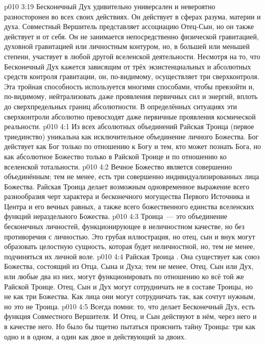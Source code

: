 \vs p010 3:19 \pc Бесконечный Дух удивительно универсален и невероятно разносторонен во всех своих действиях. Он действует в сферах разума, материи и духа. Совместный Вершитель представляет ассоциацию Отец\hyp{}Сын, но он также действует и от себя. Он не занимается непосредственно физической гравитацией, духовной гравитацией или личностным контуром, но, в большей или меньшей степени, участвует в любой другой вселенской деятельности. Несмотря на то, что Бесконечный Дух кажется зависящим от трёх экзистенциальных и абсолютных средств контроля гравитации, он, по\hyp{}видимому, осуществляет три сверхконтроля. Эта тройная способность используется многими способами, чтобы превзойти и, по\hyp{}видимому, нейтрализовать даже проявления первичных сил и энергий, вплоть до сверхпредельных границ абсолютности. В определённых ситуациях эти сверхконтроли абсолютно превосходят даже первичные проявления космической реальности.
\vs p010 4:1 Из всех абсолютных объединений Райская Троица (первое триединство) уникальна как исключительное объединение личного Божества. Бог действует как Бог только по отношению к Богу и тем, кто может познать Бога, но как абсолютное Божество только в Райской Троице и по отношению ко вселенской тотальности.
\vs p010 4:2 \pc Вечное Божество является совершенно объединённым; тем не менее, есть три совершенно индивидуализированных лица Божества. Райская Троица делает возможным одновременное выражение всего разнообразия черт характера и бесконечного могущества Первого Источника и Центра и его вечных равных, а также всего божественного единства вселенских функций нераздельного Божества.
\vs p010 4:3 Троица~--- это объединение бесконечных личностей, функционирующее в неличностном качестве, но без противоречия с личностью. Это грубая иллюстрация, но отец, сын и внук могут образовать целостную сущность, которая будет неличностной, но, тем не менее, подчиняться их личной воле.
\vs p010 4:4 Райская Троица . Она существует как союз Божества, состоящий из Отца, Сына и Духа; тем не менее, Отец, Сын или Дух, или любые два из них, могут функционировать по отношению ко всё той же Райской Троице. Отец, Сын и Дух могут сотрудничать не в составе Троицы, но не как три Божества. Как лица они могут сотрудничать так, как сочтут нужным, но это не Троица.
\vs p010 4:5 \pc Всегда помни: то, что делает Бесконечный Дух, есть функция Совместного Вершителя. И Отец, и Сын действуют в нём, через него и в качестве него. Но было бы тщетно пытаться прояснить тайну Троицы: три как одно и в одном, а один как двое и действующий за двоих.
